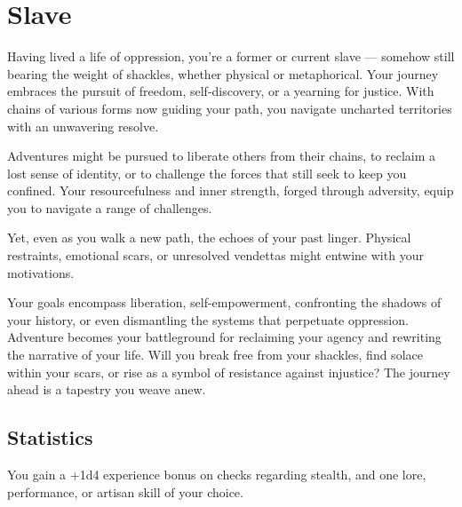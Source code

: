 \section{Slave}\label{background:slave}
Having lived a life of oppression, you're a former or current slave — somehow still bearing the weight of shackles, whether physical or metaphorical.
Your journey embraces the pursuit of freedom, self-discovery, or a yearning for justice.
With chains of various forms now guiding your path, you navigate uncharted territories with an unwavering resolve.

Adventures might be pursued to liberate others from their chains, to reclaim a lost sense of identity, or to challenge the forces that still seek to keep you confined.
Your resourcefulness and inner strength, forged through adversity, equip you to navigate a range of challenges.

Yet, even as you walk a new path, the echoes of your past linger.
Physical restraints, emotional scars, or unresolved vendettas might entwine with your motivations.

Your goals encompass liberation, self-empowerment, confronting the shadows of your history, or even dismantling the systems that perpetuate oppression.
Adventure becomes your battleground for reclaiming your agency and rewriting the narrative of your life.
Will you break free from your shackles, find solace within your scars, or rise as a symbol of resistance against injustice?
The journey ahead is a tapestry you weave anew.

\subsection{Statistics}
You gain a +1d4 experience bonus on checks regarding stealth, and one lore, performance, or artisan skill of your choice.
